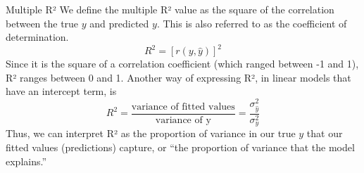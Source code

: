 \documentclass[aspectratio=169]{../latex_main/tntbeamer}  %
\begin{document}
	
	\begin{frame}{Multiple R²}
	   We define the multiple R² value as the square of the correlation between the true $y$ and predicted $y$. This is also referred to as the coefficient of determination.
	    \begin{equation*}
	        R^2 = [r(y,\hat{y})]^2
	    \end{equation*}
	    Since it is the square of a correlation coefficient (which ranged between -1 and 1), R² ranges between 0 and 1. Another way of expressing R², in linear models that have an intercept term, is
        \begin{equation*}
	        R^2 = \frac{\text{variance of fitted values}}{\text{variance of y}} = \frac{\sigma_{\hat{y}}^2}{\sigma_{y}^2}
	    \end{equation*}
	   Thus, we can interpret R² as the proportion of variance in our true $y$ that our fitted values (predictions) capture, or “the proportion of variance that the model explains.”
	\end{frame}
	
	
	
\end{document}
